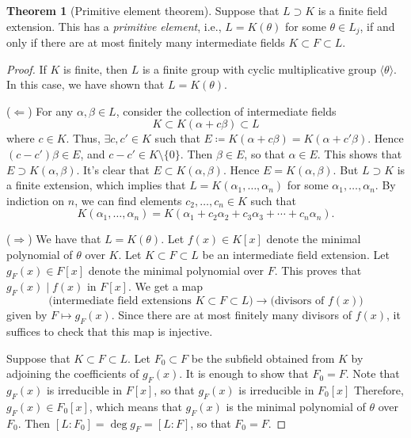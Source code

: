 \documentclass[10pt,letterpaper,cm]{nupset}
\theoremstyle{definition}
\theoremstyle{theorem}
\newtheorem{theorem}[definition]{Theorem}
\theoremstyle{remark}
\newcommand{\1}{\mathbf{1}}
\newcommand{\0}{\vec 0}
\begin{document}
\begin{theorem}[Primitive element theorem]
Suppose that $L \supset K$ is a finite field extension. This has a \textit{primitive element}, i.e.,  $L= K(\theta)$ for some $\theta \in L_j$, if and only if there are at most finitely many intermediate fields $K \subset F \subset L$.
\end{theorem}
\begin{proof}
If $K$ is finite, then $L$ is a finite group with cyclic multiplicative group $\langle \theta \rangle$. In this case, we have shown  that $L = K(\theta)$.

\medskip


($\Longleftarrow$) For any $\alpha, \beta \in L$, consider the collection of intermediate fields $$K \subset K(\alpha + c\beta) \subset L$$ where $c\in K$. Thus,  $ \exists c, c' \in K$ such that $E\coloneqq  K(\alpha + c \beta) = K(\alpha + c' \beta)$. Hence $(c - c')\beta \in E$, and $c- c' \in K \setminus \{0\}$. Then $ \beta \in E$, so that $\alpha \in E$. This shows that $E \supset K(\alpha, \beta)$. It's clear that $E \subset K(\alpha, \beta)$. Hence $E = K(\alpha, \beta)$. But $L \supset K$ is a finite extension, which implies that $L = K(\alpha_1, \ldots, \alpha_n)$ for some $\alpha_1, \ldots, \alpha_n$. By indiction on $n$, we can find elements $c_2, \ldots, c_n \in K$ such that $$ K(\alpha_1, \ldots, \alpha_n) = K(\alpha_1 + c_2\alpha_2 + c_3\alpha_3 + \cdots + c_n \alpha_n ) . $$

\medskip


($\Longrightarrow$) We have that $L= K(\theta)$. Let $f(x) \in K[x]$ denote the minimal polynomial of $\theta$ over $K$. Let $K \subset F \subset L$ be an intermediate field extension. Let $g_F(x) \in F[x]$ denote the minimal polynomial over $F$. This proves that $g_F(x) \mid f(x)$ in $F[x]$. We get a map $$\text{(intermediate field extensions } K \subset F \subset L\text{)} \to \text{(divisors of } f(x)\text{)}$$ given by $F \mapsto g_F(x)$. Since there are at most finitely many divisors of $f(x)$, it suffices to check that this map is injective. 

\medskip

 Suppose that $K \subset F \subset L$. Let $F_0 \subset F$ be the subfield obtained from $K$ by adjoining the coefficients of $g_F(x)$. It is enough to show that $F_0 = F$. Note that $g_F(x)$ is irreducible in $F[x]$, so that $g_F(x)$ is irreducible in $F_0[x]$ Therefore, $g_F(x) \in F_0[x]$, which means that $g_F(x)$ is the minimal polynomial of $\theta$ over $F_0$. Then $[L: F_0] = \deg{g_F} = [L: F]$, so that $F_0 = F$. 
\end{proof}
\end{document}
